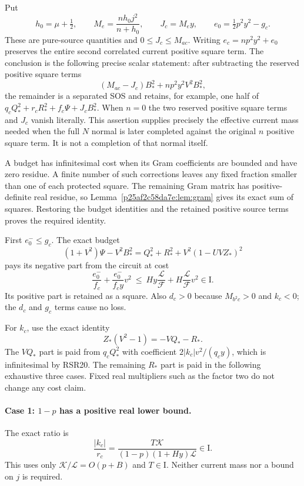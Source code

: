 Put
\[
 h_0=\mu+\tfrac12,\qquad
 M_e=\frac{nh_0j^2}{n+h_0},\qquad J_c=M_ey,
 \qquad e_0=\tfrac12p^2y^2-g_c.
 \tag{RSR21}
\]
These are pure-source quantities and $0\leq J_c\leq M_{ac}$.
Writing $e_c=np^2y^2+e_0$ preserves the entire second correlated
current positive square term. The conclusion is the following precise scalar
statement: after subtracting the reserved positive square terms
\[
 (M_{ac}-J_c)B_*^2+np^2y^2V^2B_*^2,
 \tag{RSR22}
\]
the remainder is a separated SOS and retains, for example, one half
of $q_cQ_*^2+r_cR_*^2+f_c\Psi+J_cB_*^2$.
When $n=0$ the two reserved positive square terms and $J_c$ vanish literally.
This assertion supplies precisely the effective current mass needed
when the full $N$ normal is later completed against the original $n$
positive square term. It is not a completion of that normal itself.

A budget has infinitesimal cost when its Gram coefficients are
bounded and have zero residue. A finite number of such corrections
leaves any fixed fraction smaller than one of each protected square.
The remaining Gram matrix has positive-definite real residue, so
Lemma~\ref{p25af2c58da7e:lem:gram} gives its exact sum of squares.
Restoring the budget identities and the retained positive source
terms proves the required identity.

First $e_0^-\leq g_c$. The exact budget
\[
 (1+V^2)\Psi-V^2B_*^2
 =Q_*^2+R_*^2+V^2(1-UVZ_*)^2
 \tag{RSR23}
\]
pays its negative part from the circuit at cost
\[
 \frac{e_0^-}{f_c}+\frac{e_0^-}{f_cy}v^2
 \ \leq\ Hy\frac{\mathcal L}{\mathcal F}
       +H\frac{\mathcal L}{\mathcal F}v^2\in\mathrm I.
\]
Its positive part is retained as a square. Also $d_c>0$ because
$M_{b^2c}>0$ and $k_c<0$; the $d_c$ and $g_c$ terms cause no loss.

For $k_c$, use the exact identity
\[
 Z_*(V^2-1)=-VQ_*-R_*.
 \tag{RSR24}
\]
The $VQ_*$ part is paid from $q_cQ_*^2$ with coefficient
$2|k_c|v^2/(q_cy)$, which is infinitesimal by RSR20. The remaining
$R_*$ part is paid in the following exhaustive three cases. Fixed
real multipliers such as the factor two do not change any cost claim.

\paragraph{Case 1: $1-p$ has a positive real lower bound.}
The exact ratio is
\[
 \frac{|k_c|}{r_c}
 =\frac{T\mathcal K}{(1-p)(1+Hy)\mathcal L}\in\mathrm I.
 \tag{RSR25}
\]
This uses only $\mathcal K/\mathcal L=O(p+B)$ and $T\in\mathrm I$.
Neither current mass nor a bound on $j$ is required.

